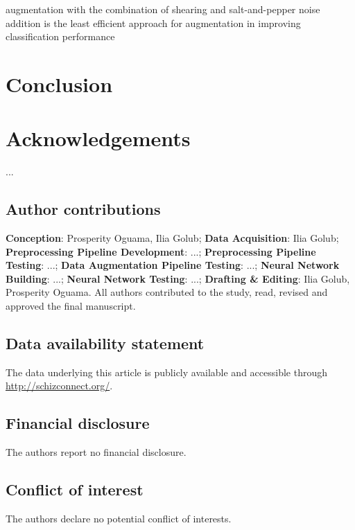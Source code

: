 augmentation with the combination of shearing and salt-and-pepper noise addition is the least efficient approach for augmentation in improving classification performance 

\section{Conclusion}

\lipsum[9-10]



\section*{Acknowledgements}

...

\subsection*{Author contributions}

\textbf{Conception}: Prosperity Oguama, Ilia Golub; \textbf{Data Acquisition}: Ilia Golub; \textbf{Preprocessing Pipeline Development}: ...; \textbf{Preprocessing Pipeline Testing}: ...; \textbf{Data Augmentation Pipeline Testing}: ...; \textbf{Neural Network Building}: ...; \textbf{Neural Network Testing}: ...; \textbf{Drafting \& Editing}: Ilia Golub, Prosperity Oguama. All authors contributed to the study, read, revised and approved the final manuscript.

\subsection*{Data availability statement}
The data underlying this article is publicly available and accessible through \hyperlink{Schizconnect}{http://schizconnect.org/}.

\subsection*{Financial disclosure}

The authors report no financial disclosure.

\subsection*{Conflict of interest}

The authors declare no potential conflict of interests.

